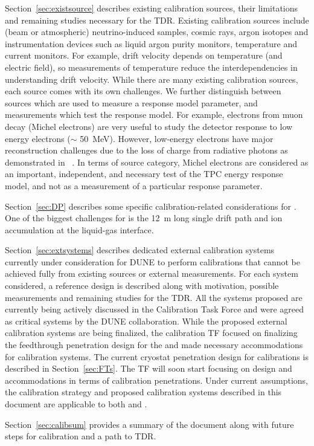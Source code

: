 Section~\ref{sec:existsource} describes existing calibration sources, their limitations and remaining studies necessary for the TDR. Existing calibration sources include (beam or atmospheric)  neutrino-induced samples, cosmic rays, argon isotopes and instrumentation devices such as liquid argon purity monitors, temperature and current monitors. For example, drift velocity depends on temperature (and electric field), so measurements of temperature reduce the interdependencies in understanding drift velocity. While there are many existing calibration sources, each source comes with its own challenges. We further distinguish between sources which are used to measure a response model parameter, and measurements which test the response model. For example, electrons from 
muon decay (Michel electrons) are very useful to study the detector response to low energy electrons ($\sim$ \SI{50}{\MeV}). However, low-energy electrons have major reconstruction challenges due to the loss of charge from radiative photons as demonstrated in ~\cite{uBmichel}. In terms of source category, Michel electrons are considered as an important, independent, and necessary test of the TPC energy response model, and not as a measurement of a particular response parameter.

Section~\ref{sec:DP} describes some specific calibration-related considerations for . One of the biggest challenges for  is the \SI{12}{\m} long single drift path and ion accumulation at the liquid-gas interface.

Section~\ref{sec:extsystems} describes dedicated external calibration systems currently under consideration for DUNE to perform calibrations that cannot be achieved fully from existing sources or external measurements. For each system considered, a reference design is described along with motivation, possible measurements and remaining studies for the TDR. All the systems proposed are currently being actively discussed in the Calibration Task Force and were agreed as critical systems by the DUNE collaboration. While the proposed external calibration systems are being finalized, the calibration TF focused on finalizing the feedthrough penetration design for the  and made necessary accommodations for calibration systems. The current cryostat penetration design for  calibrations is described in Section~\ref{sec:FTs}. The TF will soon start focusing on  design and accommodations in terms of calibration penetrations. Under current assumptions, the calibration strategy and proposed calibration systems described in this document are applicable to both  and . 

Section~\ref{sec:calibsum} provides a summary of the document along with future steps for calibration and a path to TDR. 
 
    